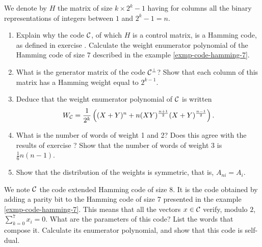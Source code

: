  
\begin{exo}
\label{exo-pol-enumerateur-hamming}
 
We denote by $ H $ the matrix of size $ k \times 2^k-1 $ having for columns all the binary representations of integers between $ 1 $ and $ 2^k-1 = n $. \begin{enumerate}
\item Explain why the code $ \mathcal{C} $, of which $ H $ is a control matrix, is a Hamming code, as defined in exercise . Calculate the weight enumerator polynomial of the Hamming code of size $ 7 $ described in the example \ref{exmp-code-hamming-7}.
\item {} What is the generator matrix of the code $ \mathcal{C}^\bot $? Show that each column of this matrix has a Hamming weight equal to $ 2^{k-1} $.
\item Deduce that the weight enumerator polynomial of $ \mathcal{C} $ is written
\begin{equation*}
W_{\mathcal{C}} = \frac{1}{2^k} \left((X + Y)^n + n (XY)^{\frac{n + 1}{2}} (X + Y)^{\frac{n-1}{2}} \right).
\end{equation*}
 
\item What is the number of words of weight 1 and 2? Does this agree with the results of exercise ? Show that the number of words of weight 3 is $ \frac{1}{6} n (n-1) $.
\item Show that the distribution of the weights is symmetric, that is, $ A_{ni} = A_i $.
\end{enumerate}
\end{exo}
 
 
\begin{exo}
\label{exo-code-hamming-extended}
 
     We note $ \mathcal{C} $ the code extended Hamming code of size 8. It is the code obtained by adding a parity bit to the Hamming code of size 7 presented in the example \ref{exmp-code-hamming-7}. This means that all the vectors $ x \in \mathcal{C} $ verify, modulo $ 2 $, $ \sum_{k = 0}^{7}{x_i} = 0 $. What are the parameters of this code? List the words that compose it. Calculate its enumerator polynomial, and show that this code is self-dual.
\end{exo}
 
